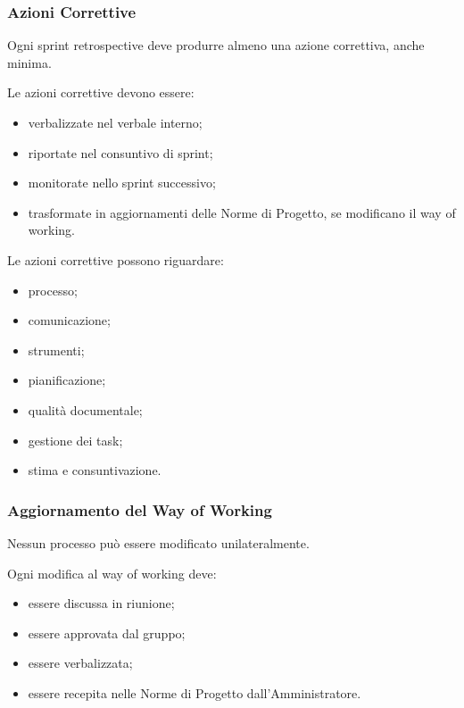 
\subsubsection{Azioni Correttive}

Ogni sprint retrospective deve produrre almeno una azione correttiva, anche minima.

Le azioni correttive devono essere:

\begin{itemize}
    \item verbalizzate nel verbale interno;
    \item riportate nel consuntivo di sprint;
    \item monitorate nello sprint successivo;
    \item trasformate in aggiornamenti delle Norme di Progetto, se modificano il
    way of working.
\end{itemize}

Le azioni correttive possono riguardare:

\begin{itemize}
    \item processo;
    \item comunicazione;
    \item strumenti;
    \item pianificazione;
    \item qualità documentale;
    \item gestione dei task;
    \item stima e consuntivazione.
\end{itemize}


\subsubsection{Aggiornamento del Way of Working}

Nessun processo può essere modificato unilateralmente.

Ogni modifica al way of working deve:

\begin{itemize}
    \item essere discussa in riunione;
    \item essere approvata dal gruppo;
    \item essere verbalizzata;
    \item essere recepita nelle Norme di Progetto dall'Amministratore.
\end{itemize}

